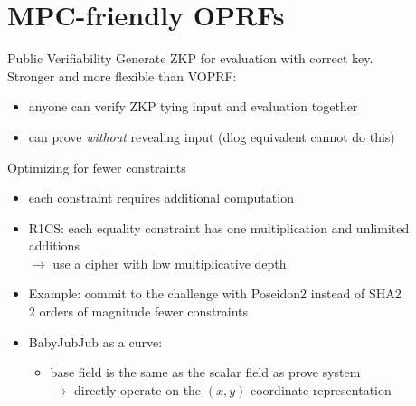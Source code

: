 \documentclass[10pt]{beamer}
\begin{document}
\section{MPC-friendly OPRFs}

\begin{frame}{Public Verifiability}
  Generate ZKP for evaluation with correct key.\\
  \pause Stronger and more flexible than VOPRF: 
  \begin{itemize}
    \item  anyone can verify ZKP tying input and
      evaluation together\pause
    \item can prove \emph{without} revealing input (dlog equivalent cannot do
      this)
  \end{itemize}
\end{frame}

\begin{frame}{Optimizing for fewer constraints}
  \begin{itemize}
    \item 
      each constraint requires additional computation
    \item R1CS: each equality constraint has one multiplication and unlimited
      additions \\ \pause $\rightarrow$ use a cipher with low multiplicative depth\pause
    \item Example: commit to the challenge with Poseidon2 instead of SHA2
      \\ 2 orders of magnitude fewer constraints\pause
    \item BabyJubJub as a curve: 
      \begin{itemize}
        \item base field is the same as the scalar field as prove system\\ $\rightarrow$
          directly operate on the $(x,y)$
          coordinate representation
      \end{itemize}
  \end{itemize}
\end{frame}
\end{document}
